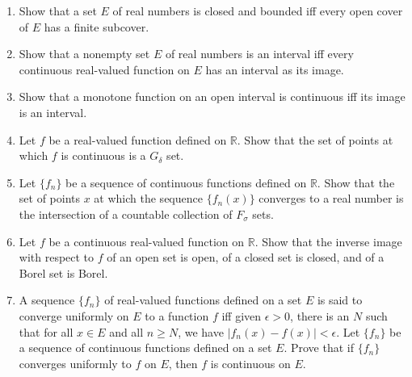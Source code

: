 \begin{enumerate}
	\item Show that a set $E$ of real numbers is closed and bounded iff every open cover of $E$ has a finite subcover.
	\item Show that a nonempty set $E$ of real numbers is an interval iff every continuous real-valued function on $E$ has an interval as its image.
	\item Show that a monotone function on an open interval is continuous iff its image is an interval. 
	\item Let $f$ be a real-valued function defined on $\mathbb{R}$. Show that the set of points at which $f$ is continuous is a $G_\delta$ set.
	\item Let $\{ f_n\}$ be a sequence of continuous functions defined on $\mathbb{R}$. Show that the set of points $x$ at which the sequence $\{f_n(x)\}$ converges to a real number is the intersection of a countable collection of $F_\sigma$ sets.
	\item Let $f$ be a continuous real-valued function on $\mathbb{R}$. Show that the inverse image with respect to $f$ of an open set is open, of a closed set is closed, and of a Borel set is Borel.
	\item A sequence $\{f_n\}$ of real-valued functions defined on a set $E$ is said to converge uniformly on $E$ to a function $f$ iff given $\epsilon >0$, there is an $N$ such that for all $x \in E$ and all $n \ge N$, we have $|f_n(x) - f(x)| < \epsilon$. Let $\{f_n\}$ be a sequence of continuous functions defined on a set $E$. Prove that if $\{f_n\}$ converges uniformly to $f$ on $E$, then $f$ is continuous on $E$. 
\end{enumerate}
